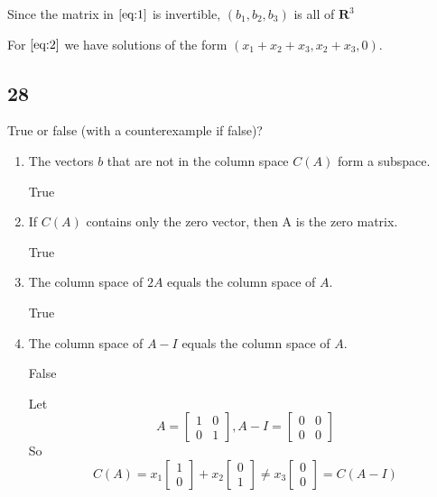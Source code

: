 \documentclass[12pt,letterpaper]{article}
\begin{document}
      Since the matrix in $\eqref{eq:1}$ is invertible, $(b_1, b_2, b_3)$ is all of $\mathbf{R}^3$

      For $\eqref{eq:2}$ we have solutions of the form
      $(x_1 + x_2 + x_3, x_2 + x_3, 0)$.
    \subsection*{28}
      True or false (with a counterexample if false)?
      \begin{enumerate}
        \item The vectors $b$ that are not in the column space $C(A)$ form a subspace.

          True
        \item If $C(A)$ contains only the zero vector, then A is the zero matrix.

          True
        \item The column space of $2A$ equals the column space of $A$.

          True
        \item The column space of $A-I$ equals the column space of $A$.

          False

          Let
          \[
            A = \left[
            \begin{array}{cc}
              1 & 0 \\
              0 & 1
            \end{array}
            \right]
            ,
            A - I = \left[
            \begin{array}{cc}
              0 & 0 \\
              0 & 0
            \end{array}
            \right]
          \]
          So
          \[
            C(A) = x_1\left[
            \begin{array}{c}
              1 \\
              0
            \end{array}
            \right]
            +
            x_2\left[
            \begin{array}{c}
              0 \\
              1
            \end{array}
            \right]
            \neq
            x_3\left[
            \begin{array}{c}
              0 \\
              0
            \end{array}
            \right]
            =
            C(A-I)
          \]
      \end{enumerate}
\end{document}
